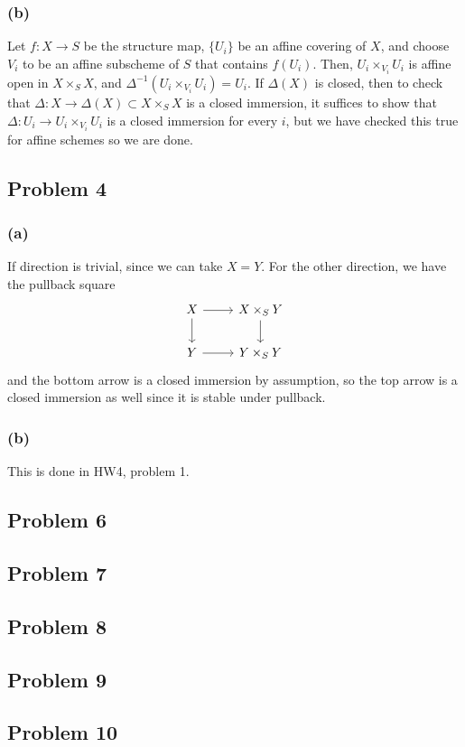 \documentclass{article}
\theoremstyle{definition}
\theoremstyle{definition}
\theoremstyle{definition}
\theoremstyle{definition}
\theoremstyle{definition}
\theoremstyle{definition}
\theoremstyle{definition}
\begin{document}
\subsubsection*{(b)}
Let $f: X\to S$ be the structure map, $\{U_i\}$ be an affine covering of $X$, and choose $V_i$ to be an affine subscheme of $S$ that contains $f(U_i)$. Then, $U_i\times_{V_i}U_i$ is affine open in $X\times_S X$, and $\Delta^{-1}(U_i\times_{V_i}U_i)=U_i$. If $\Delta (X)$ is closed, then to check that $\Delta: X\to \Delta(X)\subset X\times_{S}X$ is a closed immersion, it suffices to show that $\Delta: U_i\to U_i\times_{V_i}U_i$ is a closed immersion for every $i$, but we have checked this true for affine schemes so we are done. 




\subsection*{Problem 4}
\subsubsection*{(a)}
If direction is trivial, since we can take $X=Y$. For the other direction, we have the pullback square
\[\begin{tikzcd}
X\arrow[d]\arrow[r]& X\times_S Y\arrow[d]\\
Y\arrow[r]&Y\times_S Y
\end{tikzcd}\]
and the bottom arrow is a closed immersion by assumption, so the top arrow is a closed immersion as well since it is stable under pullback.


\subsubsection*{(b)}
This is done in HW4, problem 1.



\subsection*{Problem 6}

\subsection*{Problem 7}

\subsection*{Problem 8}

\subsection*{Problem 9}


\subsection*{Problem 10}
\end{document}
